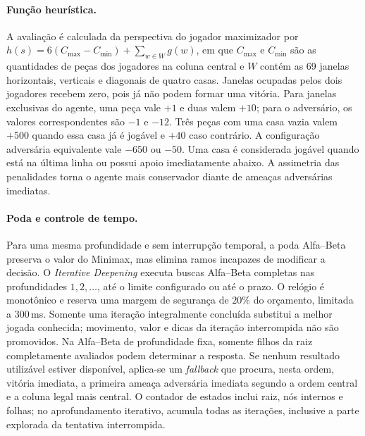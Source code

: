 \documentclass[letterpaper]{article} %
\begin{document}
\paragraph{Função heurística.}
A avaliação é calculada da perspectiva do jogador maximizador por $h(s)=6(C_{\mathrm{max}}-C_{\mathrm{min}})+\sum_{w\in W}g(w)$, em que $C_{\mathrm{max}}$ e $C_{\mathrm{min}}$ são as quantidades de peças dos jogadores na coluna central e $W$ contém as 69 janelas horizontais, verticais e diagonais de quatro casas. Janelas ocupadas pelos dois jogadores recebem zero, pois já não podem formar uma vitória. Para janelas exclusivas do agente, uma peça vale $+1$ e duas valem $+10$; para o adversário, os valores correspondentes são $-1$ e $-12$. Três peças com uma casa vazia valem $+500$ quando essa casa já é jogável e $+40$ caso contrário. A configuração adversária equivalente vale $-650$ ou $-50$. Uma casa é considerada jogável quando está na última linha ou possui apoio imediatamente abaixo. A assimetria das penalidades torna o agente mais conservador diante de ameaças adversárias imediatas.

\paragraph{Poda e controle de tempo.}
Para uma mesma profundidade e sem interrupção temporal, a poda Alfa--Beta preserva o valor do Minimax, mas elimina ramos incapazes de modificar a decisão. O \textit{Iterative Deepening} executa buscas Alfa--Beta completas nas profundidades $1,2,\ldots$, até o limite configurado ou até o prazo. O relógio é monotônico e reserva uma margem de segurança de $20\%$ do orçamento, limitada a $300$\,ms. Somente uma iteração integralmente concluída substitui a melhor jogada conhecida; movimento, valor e dicas da iteração interrompida não são promovidos. Na Alfa--Beta de profundidade fixa, somente filhos da raiz completamente avaliados podem determinar a resposta. Se nenhum resultado utilizável estiver disponível, aplica-se um \textit{fallback} que procura, nesta ordem, vitória imediata, a primeira ameaça adversária imediata segundo a ordem central e a coluna legal mais central. O contador de estados inclui raiz, nós internos e folhas; no aprofundamento iterativo, acumula todas as iterações, inclusive a parte explorada da tentativa interrompida.
\end{document}
